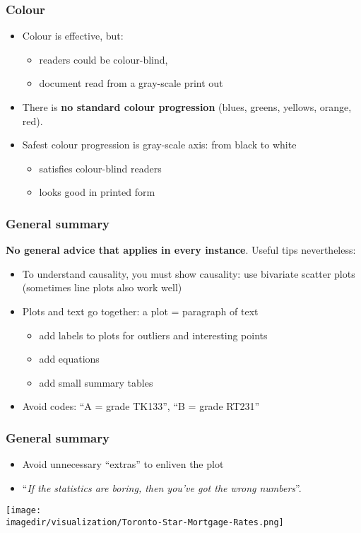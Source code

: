 \begin{frame}\frametitle{Colour}
	\begin{itemize}
		\item	Colour is effective, but: 
		\begin{itemize}
			\item	readers could be colour-blind, 
			\item	document read from a gray-scale print out 
		\end{itemize}
	\end{itemize}
	\begin{itemize}
		\item	There is \textbf{no standard colour progression} (blues, greens, yellows, orange, red). 
		\item	Safest colour progression is gray-scale axis: from black to white 
		\begin{itemize}
			\item	satisfies colour-blind readers 
			\item	looks good in printed form 
		\end{itemize}
	\end{itemize}
\end{frame}

\begin{frame}\frametitle{General summary}
	
	\textbf{No general advice that applies in every instance}. Useful tips nevertheless:
	\begin{itemize}
		\item	To understand causality, you must show causality: use bivariate scatter plots (sometimes line plots also work well) 
		\item	Plots and text go together: a plot = paragraph of text 
		\begin{itemize}
			\item	add labels to plots for outliers and interesting points 
			\item	add equations 
			\item	add small summary tables 
		\end{itemize}
		\item	Avoid codes: ``A = grade TK133'', ``B = grade RT231'' 
	\end{itemize}
\end{frame}

\begin{frame}\frametitle{General summary}
	\begin{itemize}
		\item	Avoid unnecessary ``extras'' to enliven the plot 
		\item	``\emph{If the statistics are boring, then you've got the wrong numbers}''. 
	\end{itemize}
	\begin{center}
		\texttt{[image: \\imagedir/visualization/Toronto-Star-Mortgage-Rates.png]}
	\end{center}
\end{frame}

